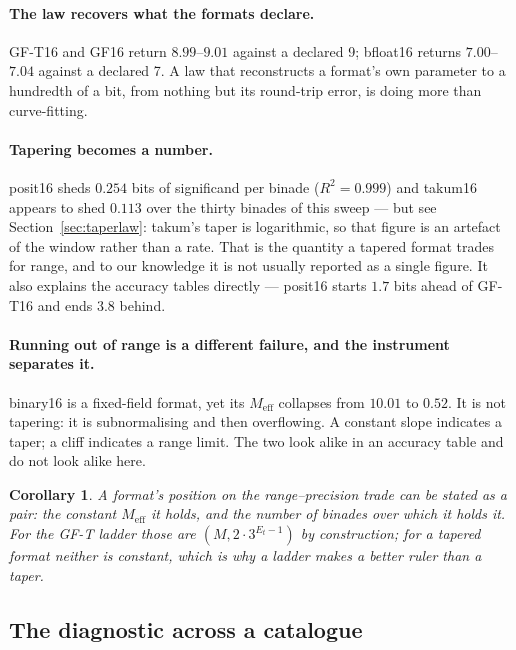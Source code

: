 \documentclass[11pt]{article}
\newtheorem{corollary}{Corollary}
\theoremstyle{definition}
\begin{document}
\paragraph{The law recovers what the formats declare.} GF-T16 and GF16 return
$8.99$--$9.01$ against a declared 9; bfloat16 returns $7.00$--$7.04$ against a
declared 7. A law that reconstructs a format's own parameter to a hundredth of a
bit, from nothing but its round-trip error, is doing more than curve-fitting.

\paragraph{Tapering becomes a number.} posit16 sheds $0.254$ bits of significand
per binade ($R^2 = 0.999$) and takum16 appears to shed $0.113$ over the thirty
binades of this sweep --- but see Section~\ref{sec:taperlaw}: takum's taper is
logarithmic, so that figure is an artefact of the window rather than a rate. That is the
quantity a tapered format trades for range, and to our knowledge it is not usually
reported as a single figure. It also explains the accuracy tables directly ---
posit16 starts $1.7$ bits ahead of GF-T16 and ends $3.8$ behind.

\paragraph{Running out of range is a different failure, and the instrument
separates it.} binary16 is a fixed-field format, yet its $M_{\mathrm{eff}}$
collapses from $10.01$ to $0.52$. It is not tapering: it is subnormalising and
then overflowing. A constant slope indicates a taper; a cliff indicates a range
limit. The two look alike in an accuracy table and do not look alike here.

\begin{corollary}
A format's position on the range--precision trade can be stated as a pair: the
constant $M_{\mathrm{eff}}$ it holds, and the number of binades over which it
holds it. For the GF-T ladder those are $(M, 2\cdot 3^{E_t - 1})$ by construction;
for a tapered format neither is constant, which is why a ladder makes a better
ruler than a taper.
\end{corollary}


\subsection{The diagnostic across a catalogue}\label{sec:catalogue}
\end{document}
